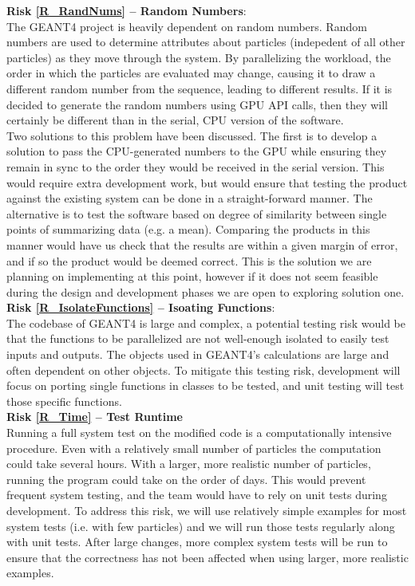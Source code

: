 \documentclass[12pt]{article}
\begin{document}
\textbf{Risk \ref{R_RandNums} -- Random Numbers}:\\
The GEANT4 project is heavily dependent on random numbers. Random numbers are used to determine attributes about particles (indepedent of all other particles) as they move through the system. By parallelizing the workload, the order in which the particles are evaluated may change, causing it to draw a different random number from the sequence, leading to different results. If it is decided to generate the random numbers using GPU API calls, then they will certainly be different than in the serial, CPU version of the software.\\

Two solutions to this problem have been discussed. The first is to develop a solution to pass the CPU-generated numbers to the GPU while ensuring they remain in sync to the order they would be received in the serial version. This would require extra development work, but would ensure that testing the product against the existing system can be done in a straight-forward manner. The alternative is to test the software based on degree of similarity between single points of summarizing data (e.g. a mean). Comparing the products in this manner would have us check that the results are within a given margin of error, and if so the product would be deemed correct. This is the solution we are planning on implementing at this point, however if it does not seem feasible during the design and development phases we are open to exploring solution one.\\

\textbf{Risk \ref{R_IsolateFunctions} -- Isoating Functions}:\\
The codebase of GEANT4 is large and complex, a potential testing risk would be that the functions to be parallelized are not well-enough isolated to easily test inputs and outputs. The objects used in GEANT4's calculations are large and often dependent on other objects. To mitigate this testing risk, development will focus on porting single functions in classes to be tested, and unit testing will test those specific functions.\\

\textbf{Risk \ref{R_Time} -- Test Runtime}\\
Running a full system test on the modified code is a computationally intensive procedure. Even with a relatively small number of particles the computation could take several hours. With a larger, more realistic number of particles, running the program could take on the order of days. This would prevent frequent system testing, and the team would have to rely on unit tests during development. To address this risk, we will use relatively simple examples for most system tests (i.e. with few particles) and we will run those tests regularly along with unit tests. After large changes, more complex system tests will be run to ensure that the correctness has not been affected when using larger, more realistic examples.
\end{document}

